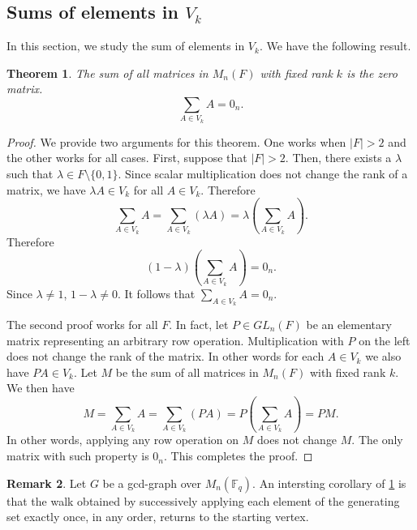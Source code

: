 \documentclass[12pt, a4paper]{amsart}
\newtheorem{thm}{Theorem}[section]
\theoremstyle{definition}
\newtheorem{rem}[thm]{Remark}
\numberwithin{equation}{section}
\begin{document}
\subsection{Sums of elements in $V_k$} \label{subsec:sum}
In this section, we study the sum of elements in $V_k$. We have the following result. 
\begin{thm} \label{thm:sum}
    The sum of all matrices in $M_n(F)$ with fixed rank $k$ is the zero matrix.
    \[\sum_{A \in V_k} A = 0_n.\]
\end{thm}
\begin{proof}

We provide two arguments for this theorem. One works when $|F|>2$ and the other works for all cases. First, suppose that $|F|>2$. Then, there exists a $\lambda$ such that $\lambda \in F \setminus \{0,1\}.$
    Since scalar multiplication does not change the rank of a matrix, we have $\lambda A \in V_k$ for all  $A \in V_k$. Therefore
    \[\sum_{A \in V_k} A = \sum_{A \in V_k} (\lambda A) = \lambda \left( \sum_{A \in V_k} A \right).\]
Therefore 
    \[(1- \lambda) \left( \sum_{A \in V_k} A \right) = 0_n.\]
    Since $\lambda \neq 1$, $1-\lambda \neq 0$. It follows that $\sum_{A \in V_k} A = 0_n.$

    
The second proof works for all $F.$ In fact, let $P \in GL_n(F)$ be an elementary matrix representing an arbitrary row operation. Multiplication with $P$ on the left does not change the rank of the matrix. In other words for each  $A \in V_k$ we also have  $PA \in V_k.$  Let $M$ be the sum of all matrices in $M_n(F)$ with fixed rank $k$. We then have
    \[M =\sum_{A \in V_k} A = \sum_{A \in V_k} (PA) = P \left( \sum_{A \in V_k} A \right) = PM.\]
    In other words, applying any row operation on $M$ does not change $M$. The only matrix with such property is $0_n$. This completes the proof.
\end{proof}


\begin{rem}
Let \( G \) be a gcd-graph over \( M_n(\mathbb{F}_q) \). An intersting corollary of \cref{thm:sum} is that the walk obtained by successively applying each element of the generating set exactly once, in any order, returns to the starting vertex.
\end{rem}
\end{document}
